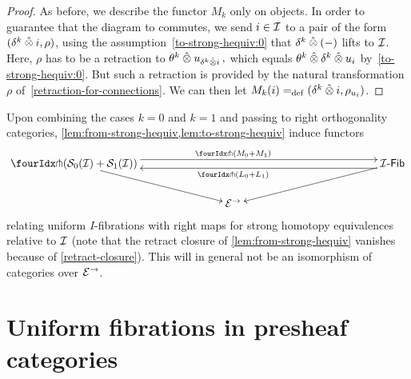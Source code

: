 \documentclass[reqno,10pt,a4paper,oneside,draft]{amsart}
\begin{document}
\begin{proof}
As before, we describe the functor $M_k$ only on objects.
In order to guarantee that the diagram to commutes, we send $i \in \cal{I}$ to a pair of the form $(\kcyl \hatotimes i, \rho)$, using the assumption~\eqref{to-strong-hequiv:0} that $\kcyl \hatotimes (-)$ lifts to $\cal{I}$.
Here, $\rho$ has to be a retraction to $\thetak \hatotimes u_{\kcyl \hatotimes i}\, ,$ which equals $\thetak \hatotimes \kcyl \hatotimes u_i$ by~\eqref{to-strong-hequiv:0}.
But such a retraction is provided by the natural transformation $\rho$ of~\cref{retraction-for-connections}.
We can then let $M_k(i) \defeq (\kcyl \hatotimes i, \rho_{u_i})$.
\end{proof}

\begin{remark} \label{relating-strong-hequiv-and-uniform-fib}
Upon combining the cases $k = 0$ and $k = 1$ and passing to right orthogonality categories, \cref{lem:from-strong-hequiv,lem:to-strong-hequiv} induce functors
\[
\xymatrix@!C{
  \liftr{(\cal{S}_0(\cal{I}) + \cal{S}_1(\cal{I}))}
  \ar[dr]
  \ar@<4pt>[rr]^{\liftr{(M_0 + M_1)}}
&&
  \Fib{\cal{I}}
  \ar[dl]
  \ar@<4pt>[ll]^{\liftr{(L_0 + L_1)}}
\\&
  \catE^\to
}
\]
relating uniform $I$-fibrations with right maps for strong homotopy equivalences relative to $\cal{I}$ (note that the retract closure of \cref{lem:from-strong-hequiv} vanishes because of \cref{retract-closure}).
This will in general not be an isomorphism of categories over $\catE^\to$.
\end{remark}


\section{Uniform fibrations in presheaf categories}
\label{sec:unifpc}
\end{document}
